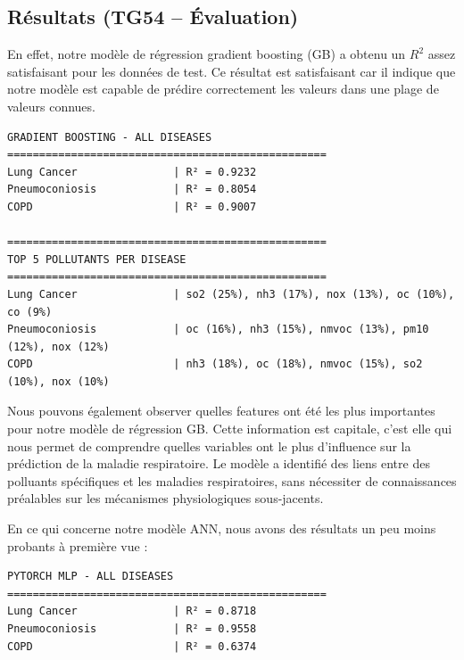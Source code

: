 \documentclass[11pt,a4paper]{article}
\begin{document}
\subsection{Résultats (TG54 -- Évaluation)}

En effet, notre modèle de régression gradient boosting (GB) a obtenu un $R^2$ assez satisfaisant pour les données de test. Ce résultat est satisfaisant car il indique que notre modèle est capable de prédire correctement les valeurs dans une plage de valeurs connues.

\begin{listing}[H]
\label{lst:gb_results}
\caption{Résultats du modèle de régression gradient boosting}
\begin{lstlisting}[style=textstyle]
GRADIENT BOOSTING - ALL DISEASES
==================================================
Lung Cancer               | R² = 0.9232
Pneumoconiosis            | R² = 0.8054
COPD                      | R² = 0.9007

==================================================
TOP 5 POLLUTANTS PER DISEASE
==================================================
Lung Cancer               | so2 (25%), nh3 (17%), nox (13%), oc (10%), co (9%)
Pneumoconiosis            | oc (16%), nh3 (15%), nmvoc (13%), pm10 (12%), nox (12%)
COPD                      | nh3 (18%), oc (18%), nmvoc (15%), so2 (10%), nox (10%)
\end{lstlisting}
\end{listing}

Nous pouvons également observer quelles features ont été les plus importantes pour notre modèle de régression GB. Cette information est capitale, c'est elle qui nous permet de comprendre quelles variables ont le plus d'influence sur la prédiction de la maladie respiratoire. Le modèle a identifié des liens entre des polluants spécifiques et les maladies respiratoires, sans nécessiter de connaissances préalables sur les mécanismes physiologiques sous-jacents.

\clearpage
En ce qui concerne notre modèle ANN, nous avons des résultats un peu moins probants à première vue :

\begin{listing}[H]
\label{lst:ann_results}
\caption{Résultats du modèle ANN}
\begin{lstlisting}[style=textstyle]
PYTORCH MLP - ALL DISEASES
==================================================
Lung Cancer               | R² = 0.8718
Pneumoconiosis            | R² = 0.9558
COPD                      | R² = 0.6374
\end{lstlisting}
\end{listing}
\end{document}
